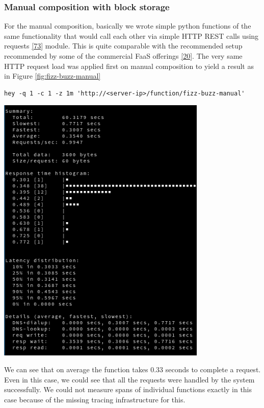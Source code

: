 \documentclass[12pt,titlepage]{article}
\begin{document}
\subsubsection{Manual composition with block storage}
\label{sec:orgfa685bc}
For the manual composition, basically we wrote simple python functions of the
same functionality that would call each other via simple HTTP REST calls using
requests \hyperref[ref:73]{[73}] module. This is quite comparable with the recommended setup
recommended by some of the commercial FaaS offerings \hyperref[ref:20]{[20}].
The very same HTTP request load was applied first on manual composition to yield
a result as in Figure \ref{fig:fizz-buzz-manual}
\begin{lstlisting}
hey -q 1 -c 1 -z 1m 'http://<server-ip>/function/fizz-buzz-manual'
\end{lstlisting}
\begin{center}
   \begin{minipage}{\linewidth}
    \centering
    \includegraphics[width=100mm]{./thesis_images/manual-compo-1.png}
    \label{fig:fizz-buzz-manual}
   \end{minipage}
\end{center}

We can see that on average the function takes 0.33 seconds to complete a
request. Even in this case, we could see that all the requests were handled by
the system successfully. We could not measure spans of individual functions
exactly in this case because of the missing tracing infrastructure for this.
\end{document}
